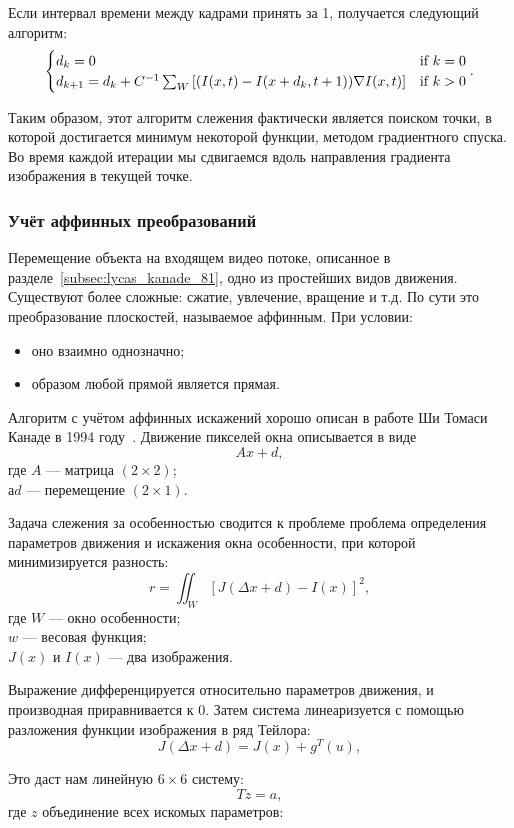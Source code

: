 Если интервал времени между кадрами принять за 1, получается следующий алгоритм:
\begin{equation}
\numberwithin{equation}{section}
\label{eq:alg_pyr}
\begin{cases} d_k = 0 &\mbox{if } k = 0 \\
d_{k+1}=d_k + C^{-1} \sum_W \left[ (I(x,t) - I(x+d_k,t + 1)) \nabla I (x,t) \right] & \mbox{if } k > 0 \end{cases}.
\end{equation}

Таким образом, этот алгоритм слежения фактически является поиском точки, в которой достигается минимум некоторой функции, методом градиентного спуска. Во время каждой итерации мы сдвигаемся вдоль направления градиента изображения в текущей точке.
\subsubsection{Учёт аффинных преобразований}
Перемещение объекта на входящем видео потоке, описанное в разделе~\ref{subsec:lycas_kanade_81}, одно из простейших видов движения. Существуют более сложные: сжатие, увлечение, вращение и т.д. По сути это преобразование плоскостей, называемое аффинным. При условии:
\begin{itemize}
\item оно взаимно однозначно;
\item образом любой прямой является прямая.
\end{itemize}

Алгоритм с учётом аффинных искажений хорошо описан в работе Ши Томаси Канаде в 1994 году~\cite{shi_tom_lyk}. Движение пикселей окна описывается в виде $$Ax + d,$$
где $A$ — матрица $(2 \times 2)$;\\
$а d$ — перемещение $(2 \times 1)$.

Задача слежения за особенностью сводится к проблеме проблема определения параметров движения и искажения окна особенности, при которой минимизируется разность:
$$r=\iint_W [J(\Delta x+d)-I(x)]^2,$$
где $W$ — окно особенности;\\
$w$ — весовая функция;\\
$J(x)$ и $I(x)$ — два изображения.

Выражение дифференцируется относительно параметров движения, и производная приравнивается к 0. Затем система линеаризуется с помощью разложения функции изображения в ряд Тейлора:
$$J(\Delta x+d)= J(x)+g^T(u),$$

Это даст нам линейную $6 \times 6$ систему:
$$Tz=a,$$
где $z$ объединение всех искомых параметров:

